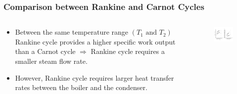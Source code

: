 \documentclass[10pt,compress]{beamer}
\begin{document}
\begin{frame}
\begin{columns}
\begin{column}[c]{0.6\linewidth}
\begin{figure}
\begin{center}
      \end{center}
     \end{figure}
    \end{column}
   \end{columns}
 \normalsize
\end{frame}



\begin{frame}
 \frametitle{Comparison between Rankine and Carnot Cycles}
  \begin{columns}
   \begin{column}[c]{0.4\linewidth}
    \begin{itemize}
     \item <1-> Between the same temperature range $\left(T_{1}\text{ and }T_{2}\right)$ Rankine cycle provides a higher specific work output than a Carnot cycle $\Longrightarrow$ Rankine cycle requires a smaller steam flow rate. 
     \item <2-> However, Rankine cycle requires larger heat transfer rates between the boiler and the condenser.
    \end{itemize}
   \end{column}
   \begin{column}[c]{0.6\linewidth}
    \begin{figure}%
     \begin{center}
      \includegraphics[width=7.5cm,clip]{./Pics/Comparison_Rankine_Carnot}
     \end{center}
    \end{figure}  
   \end{column}
  \end{columns}
 \normalsize
\end{frame}
\end{document}
